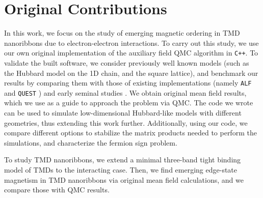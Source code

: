 \section{Original Contributions}
\label{sec:int_contributions}

In this work, we focus on the study of emerging magnetic ordering in \ac{TMD} nanoribbons due to electron-electron interactions.
To carry out this study, we use our own original implementation of the auxiliary field \ac{QMC} algorithm in \texttt{C++}.
To validate the built software, we consider previously well known models (such as the Hubbard model on the \acs{1D} chain, and the square lattice), and benchmark our results by comparing them with those of existing implementations (namely \texttt{ALF} \cite{bercx_alf_2017} and \texttt{QUEST} \cite{noauthor_quest_2012}) and early seminal studies \cite{hirsch_discrete_1983,white_numerical_1989}.
We obtain original mean field results, which we use as a guide to approach the problem via \acs{QMC}.
The code we wrote can be used to simulate low-dimensional Hubbard-like models with different geometries, thus extending this work further.
Additionally, using our code, we compare different options to stabilize the matrix products needed to perform the simulations, and characterize the fermion sign problem.

To study \ac{TMD} nanoribbons, we extend a minimal three-band tight binding model \cite{liu_three-band_2013} of \acp{TMD} to the interacting case.
Then, we find emerging edge-state magnetism in \ac{TMD} nanoribbons via original mean field calculations, and we compare those with \acs{QMC} results.